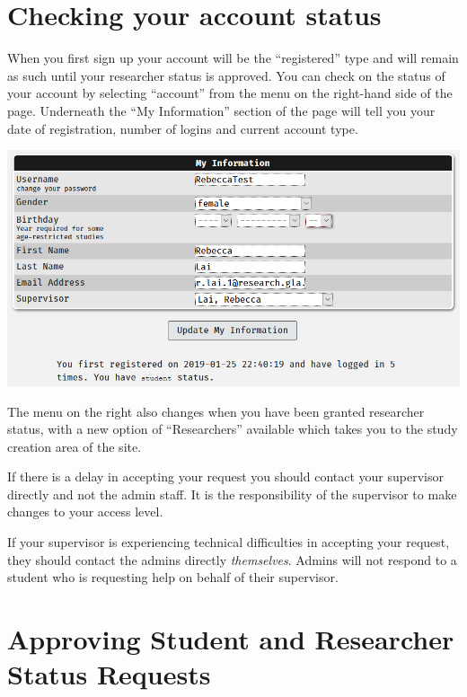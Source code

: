 \documentclass[]{book}
\begin{document}
\section{Checking your account
status}\label{checking-your-account-status}

When you first sign up your account will be the ``registered'' type and
will remain as such until your researcher status is approved. You can
check on the status of your account by selecting ``account'' from the
menu on the right-hand side of the page. Underneath the ``My
Information'' section of the page will tell you your date of
registration, number of logins and current account type.

\includegraphics{images/screenshots/check_status.png}

The menu on the right also changes when you have been granted researcher
status, with a new option of ``Researchers'' available which takes you
to the study creation area of the site.

\begin{info}
If there is a delay in accepting your request you should contact your
supervisor directly and not the admin staff. It is the responsibility of
the supervisor to make changes to your access level.

If your supervisor is experiencing technical difficulties in accepting
your request, they should contact the admins directly \emph{themselves}.
Admins will not respond to a student who is requesting help on behalf of
their supervisor.
\end{info}

\section{Approving Student and Researcher Status
Requests}\label{approving-student-and-researcher-status-requests}
\end{document}
